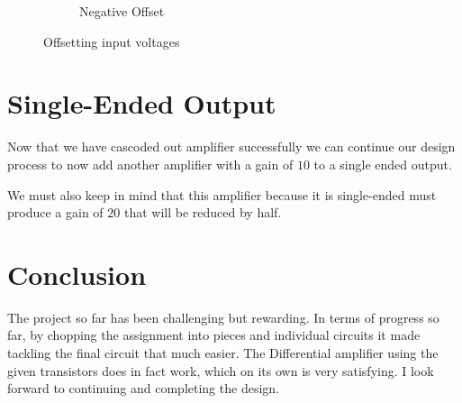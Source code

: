 \documentclass[12pt]{article}
\begin{document}
\begin{figure}
\begin{subfigure}{.5\textwidth}
			\caption{Negative Offset}
			\label{fig:sub2}
		\end{subfigure}
		\caption{Offsetting input voltages}
		\label{fig:test}
	\end{figure}
	
	\section{Single-Ended Output }
	Now that we have cascoded out amplifier successfully we can continue our design process to now add another amplifier with a gain of $10$ to a single ended output.
	
	We must also keep in mind that this amplifier because it is single-ended must produce a gain of $20$ that will be reduced by half.
	
	

	\section{Conclusion}
	The project so far has been challenging but rewarding. In terms of progress so far, by chopping the assignment into pieces and individual circuits it made tackling the final circuit that much easier. The Differential amplifier using the given transistors does in fact work, which on its own is very satisfying. I look forward to continuing and completing the design.
	
	
	
	
	
\end{document}
